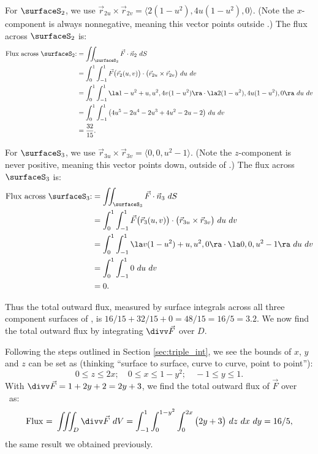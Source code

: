 {For $\surfaceS_2$, we use $\vec r_{2u}\times\vec r_{2v} = \langle 2(1-u^2), 4u(1-u^2),0\rangle$. (Note the $x$-component is always nonnegative, meaning this vector points outside \surfaceS.) The flux across $\surfaceS_2$ is:
\begin{align*}
\text{Flux across $\surfaceS_2$:} &= \iint_{\surfaceS_2} \vec F\cdot \vec n_2\ dS \\
		&= \int_0^1\int_{-1}^1 \vec F\big(\vec r_2(u,v)\big)\cdot \big(\vec r_{2u}\times\vec r_{2v}\big)\ du\ dv\\
		&= \int_0^1\int_{-1}^1 \la 1-u^2+u, u^2, 4v(1-u^2)\ra \cdot \la 2(1-u^2), 4u(1-u^2),0\ra\ du\ dv\\
		&= \int_0^1\int_{-1}^1 \big(4u^5-2u^4-2u^3+4u^2-2u-2\big)\ du\ dv\\
		&= \frac{32}{15}.
\end{align*}
\drawexampleline

For $\surfaceS_3$, we use $\vec r_{3u}\times\vec r_{3v} = \langle 0,0,u^2-1\rangle$. (Note the $z$-component is never positive, meaning this vector points down, outside of \surfaceS.) The flux across $\surfaceS_3$ is:
\begin{align*}
\text{Flux across $\surfaceS_3$:} &= \iint_{\surfaceS_3} \vec F\cdot \vec n_3\ dS \\
		&= \int_0^1\int_{-1}^1 \vec F\big(\vec r_3(u,v)\big)\cdot \big(\vec r_{3u}\times\vec r_{3v}\big)\ du\ dv\\
		&= \int_0^1\int_{-1}^1 \la v(1-u^2)+u,u^2,0\ra \cdot \la 0,0,u^2-1\ra\ du\ dv\\
		&= \int_0^1\int_{-1}^1 0\ du\ dv\\
		&= 0.
\end{align*}

Thus the total outward flux, measured by surface integrals across all three component surfaces of \surfaceS, is $16/15+32/15+0 = 48/15 = 16/5 = 3.2$. We now find the total outward flux by integrating $\divv \vec F$ over $D$.

Following the steps outlined in Section \ref{sec:triple_int}, we see the bounds of $x$, $y$ and $z$ can be set as (thinking ``surface to surface, curve to curve, point to point''):
\[
0\leq z\leq 2x;\quad 0\leq x\leq 1-y^2;\quad -1\leq y\leq 1.
\]
With $\divv \vec F = 1+2y+2 = 2y+3$, we find the total outward flux of $\vec F$ over \surfaceS\ as:
\[
\text{Flux = } \iiint_D\divv \vec F\ dV = \int_{-1}^1\int_0^{1-y^2}\int_0^{2x}\big(2y+3\big)\ dz\ dx\ dy = 16/5,
\]
the same result we obtained previously.
}\\


